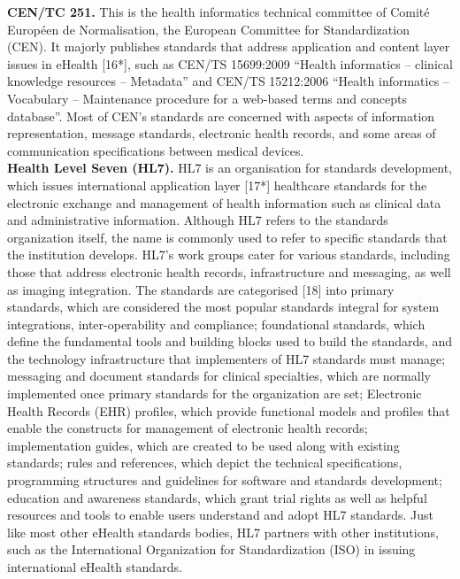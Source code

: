 \documentclass[a4paper]{article}
\begin{document}
{\bf CEN/TC 251.} This is the health informatics technical committee of Comité Européen de Normalisation, the European Committee for Standardization (CEN). It majorly publishes standards that address application and content layer issues in eHealth [16*], such as CEN/TS 15699:2009 “Health informatics – clinical knowledge resources – Metadata” and CEN/TS 15212:2006 “Health informatics – Vocabulary – Maintenance procedure for a web-based terms and concepts database”. Most of CEN's standards are concerned with aspects of information representation, message standards, electronic health records, and some areas of communication specifications between medical devices.\\
{\bf Health Level Seven (HL7).} HL7 is an organisation for standards development, which issues international application layer [17*]
healthcare standards for the electronic exchange and management of health information such as clinical data and administrative information. Although HL7 refers to the standards organization itself, the name is commonly used to refer to specific standards that the institution develops. HL7's work groups cater for various standards, including those that address electronic health records, infrastructure and messaging, as well as imaging integration. The standards are categorised [18] into primary standards, which are considered the most popular standards integral for system integrations, inter-operability and compliance; foundational standards, which define the fundamental tools and building blocks used to build the standards, and the technology infrastructure that implementers of HL7 standards must manage; messaging and document standards for clinical specialties, which are normally implemented once primary standards for the organization are set; Electronic Health Records (EHR) profiles, which provide functional models and profiles that enable the constructs for management of electronic health records; implementation guides, which are created to be used along with existing standards; rules and references, which depict the technical specifications, programming structures and guidelines for software and standards development; education and awareness standards, which grant trial rights as well as helpful resources and tools to enable users understand and adopt HL7 standards. 
Just like most other eHealth standards bodies, HL7 partners with other institutions, such as the International Organization for Standardization (ISO) in issuing international eHealth standards.\\ \\
\end{document}
